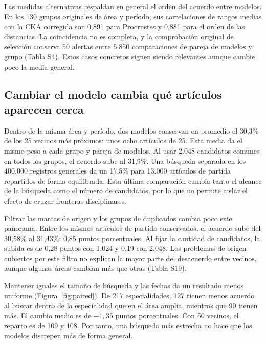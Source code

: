 \documentclass[12pt]{article}
\begin{document}
Las medidas alternativas respaldan en general el orden del acuerdo entre modelos. En los 130 grupos originales de área y período, sus correlaciones de rangos medias con la CKA corregida son 0,891 para Procrustes y 0,881 para el orden de las distancias. La coincidencia no es completa, y la comprobación original de selección conserva 50 alertas entre 5.850 comparaciones de pareja de modelos y grupo (Tabla S4). Estos casos concretos siguen siendo relevantes aunque cambie poco la media general.

\FloatBarrier
\subsection{Cambiar el modelo cambia qué artículos aparecen cerca}
Dentro de la misma área y período, dos modelos conservan en promedio el 30,3\% de los 25 vecinos más próximos: unos ocho artículos de 25. Esta media da el mismo peso a cada grupo y pareja de modelos. Al usar 2.048 candidatos comunes en todos los grupos, el acuerdo sube al 31,9\%. Una búsqueda separada en los 400.000 registros generales da un 17,5\% para 13.000 artículos de partida repartidos de forma equilibrada. Esta última comparación cambia tanto el alcance de la búsqueda como el número de candidatos, por lo que no permite aislar el efecto de cruzar fronteras disciplinares.

Filtrar las marcas de origen y los grupos de duplicados cambia poco este panorama. Entre los mismos artículos de partida conservados, el acuerdo sube del 30,58\% al 31,43\%: 0,85 puntos porcentuales. Al fijar la cantidad de candidatos, la subida es de 0,28 puntos con 1.024 y 0,19 con 2.048. Los problemas de origen cubiertos por este filtro no explican la mayor parte del desacuerdo entre vecinos, aunque algunas áreas cambian más que otras (Tabla S19).

Mantener iguales el tamaño de búsqueda y las fechas da un resultado menos uniforme (Figura~\ref{fig:paired}). De 217 especialidades, 127 tienen menos acuerdo al buscar dentro de la especialidad que en el área amplia, mientras que 90 tienen más. El cambio medio es de $-1,35$ puntos porcentuales. Con 50 vecinos, el reparto es de 109 y 108. Por tanto, una búsqueda más estrecha no hace que los modelos discrepen más de forma general.
\end{document}

